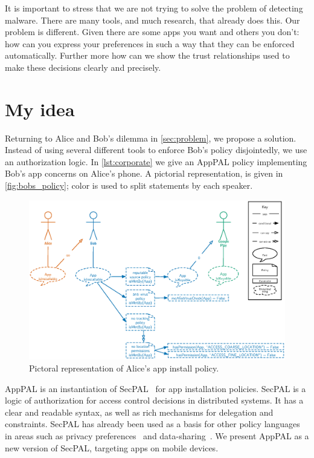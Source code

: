 \documentclass[a4paper]{scrartcl}
\newcommand{\comment}[1]{}%
\begin{document}
It is important to stress that we are not trying to solve the problem of detecting malware.
There are many tools, and much research, that already does this.
Our problem is different. 
Given there are some apps you want and others you don't:
  how can you express your preferences in such a way that they can be enforced automatically.
Further more how can we show the trust relationships used to make these decisions clearly and precisely.

\section{My idea \comment{2 pages}}
\label{sec:idea}

Returning to Alice and Bob's dilemma in \autoref{sec:problem}, we propose a solution.
Instead of using several different tools to enforce Bob's policy disjointedly, we use an authorization logic.
In \autoref{lst:corporate} we give an AppPAL policy implementing Bob's app concerns on Alice's phone.
A pictorial representation, is given in \autoref{fig:bobs_policy}; color is used to split statements by each speaker.

\begin{figure}
  \includegraphics{figures/bob-policy.eps}
  \caption{Pictoral representation of Alice's app install policy.}
\label{fig:bobs_policy}
\end{figure}

AppPAL is an instantiation of SecPAL~\citep{Becker:2006vh} for app installation policies. 
SecPAL is a logic of authorization for access control decisions in distributed systems.
It has a clear and readable syntax, as well as rich mechanisms for delegation and constraints.
SecPAL has already been used as a basis for other policy languages in areas such as privacy preferences~\citep{Becker:2009ula} and data-sharing~\citep{Aziz:2011vt}.
We present AppPAL as a new version of SecPAL, targeting apps on mobile devices.
\end{document}
